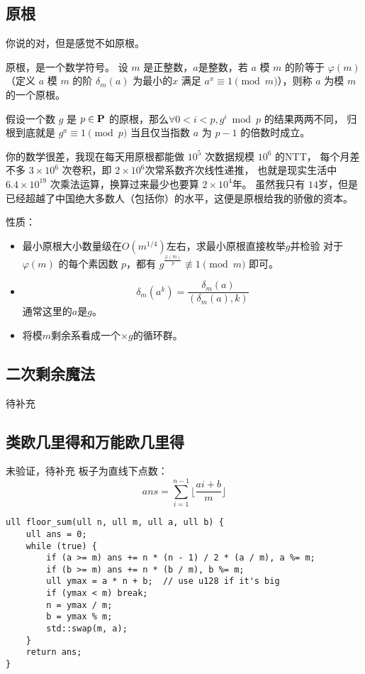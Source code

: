 \documentclass[twoside]{article}
\begin{document}
\subsection{原根}
你说的对，但是感觉不如原根。
\par 原根，是一个数学符号。
设 $m$ 是正整数，$a$是整数，若 $a$ 模 $m$ 的阶等于 $\varphi(m)$
（定义 $a$ 模 $m$ 的阶 $\delta_m(a)$ 为最小的$x$ 满足 $a^x\equiv 1 \pmod m$），则称 $a$ 为模 $m$ 的一个原根。
\par 假设一个数 $g$ 是 $p\in\textbf P$ 的原根，那么$\forall 0<i<p,g^i \bmod p$ 的结果两两不同，
归根到底就是 $g^a \equiv 1 \pmod p$ 当且仅当指数 $a$ 为 $p-1$ 的倍数时成立。
\par 你的数学很差，我现在每天用原根都能做 $10^5$ 次数据规模 $10^6$ 的NTT，
每个月差不多 $3\times10^6$ 次卷积，即 $2\times10^6$次常系数齐次线性递推，
也就是现实生活中$6.4\times10^{19}$ 次乘法运算，换算过来最少也要算 $2\times10^4$年。
虽然我只有 $14$岁，但是已经超越了中国绝大多数人（包括你）的水平，这便是原根给我的骄傲的资本。



性质：

\begin{itemize}
    \item 最小原根大小数量级在$O(m^{1/4})$左右，求最小原根直接枚举$g$并检验 对于 $\varphi(m)$ 的每个素因数 $p$，都有 $g^{\frac{\varphi(m)}{p}}\not\equiv 1\pmod m$ 即可。
    \item 
    $$
    \delta_m(a^k)=\dfrac{\delta_m(a)}{\left(\delta_m(a),k\right)}
    $$
    通常这里的$a$是$g$。
    \item 将模$m$剩余系看成一个$\times g$的循环群。
\end{itemize}\subsection{二次剩余魔法}
待补充
\subsection{类欧几里得和万能欧几里得}
未验证，待补充
板子为直线下点数：
$$ans = \sum_{i=1}^{n-1}\lfloor\frac{ai+b}{m}\rfloor $$
\begin{lstlisting}
ull floor_sum(ull n, ull m, ull a, ull b) {
	ull ans = 0;
	while (true) {
		if (a >= m) ans += n * (n - 1) / 2 * (a / m), a %= m;
		if (b >= m) ans += n * (b / m), b %= m;
		ull ymax = a * n + b;  // use u128 if it's big
		if (ymax < m) break;
		n = ymax / m;
		b = ymax % m;
		std::swap(m, a);
	}
	return ans;
}\end{lstlisting}
\end{document}

